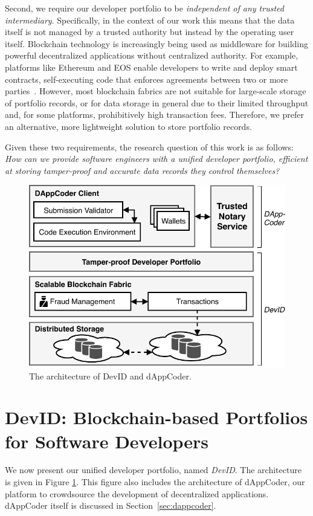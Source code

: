 Second, we require our developer portfolio to be \emph{independent of any trusted intermediary}.
Specifically, in the context of our work this means that the data itself is not managed by a trusted authority but instead by the operating user itself.
Blockchain technology is increasingly being used as middleware for building powerful decentralized applications without centralized authority.
For example, platforms like Ethereum and EOS enable developers to write and deploy smart contracts, self-executing code that enforces agreements between two or more parties~\cite{szabo1997formalizing}.
However, most blockchain fabrics are not suitable for large-scale storage of portfolio records, or for data storage in general due to their limited throughput and, for some platforms, prohibitively high transaction fees.
Therefore, we prefer an alternative, more lightweight solution to store portfolio records.

Given these two requirements, the research question of this work is as follows:
\textit{How can we provide software engineers with a unified developer portfolio, efficient at storing tamper-proof and accurate data records they control themselves?}
\begin{figure}[t!]
	\centering
	\includegraphics[width=.8\linewidth]{devid/resources/architecture.pdf}
	\caption{The architecture of DevID and dAppCoder.}
	\label{fig:system_architecture}
\end{figure}

\section{DevID: Blockchain-based Portfolios for Software Developers}
\label{sec:devid_architecture}
We now present our unified developer portfolio, named \emph{DevID}.
The architecture is given in Figure \ref{fig:system_architecture}.
This figure also includes the architecture of dAppCoder, our platform to crowdsource the development of decentralized applications.
dAppCoder itself is discussed in Section~\ref{sec:dappcoder}.

